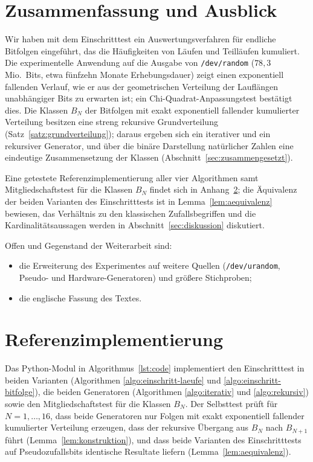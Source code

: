 \documentclass[11pt,a4paper]{scrartcl}
\theoremstyle{plain}
\theoremstyle{definition}
\theoremstyle{remark}
\begin{document}
\section{Zusammenfassung und Ausblick}\label{sec:schluss}

Wir haben mit dem Einschritttest ein Auswertungsverfahren für endliche
Bitfolgen eingeführt, das die Häufigkeiten von Läufen und Teilläufen
kumuliert. Die experimentelle Anwendung auf die Ausgabe von
\texttt{/dev/random} ($78,3$ Mio.\ Bits, etwa fünfzehn Monate
Erhebungsdauer) zeigt einen exponentiell fallenden Verlauf, wie er aus
der geometrischen Verteilung der Lauflängen unabhängiger Bits zu
erwarten ist; ein Chi-Quadrat-Anpassungstest bestätigt dies. Die
Klassen $B_N$ der Bitfolgen mit exakt exponentiell fallender
kumulierter Verteilung besitzen eine streng rekursive
Grundverteilung (Satz~\ref{satz:grundverteilung}); daraus ergeben sich
ein iterativer und ein rekursiver Generator, und über die binäre
Darstellung natürlicher Zahlen eine eindeutige Zusammensetzung der
Klassen (Abschnitt~\ref{sec:zusammengesetzt}).

Eine getestete Referenzimplementierung aller vier Algorithmen samt
Mitgliedschaftstest für die Klassen $B_N$ findet sich in
Anhang~\ref{sec:code}; die Äquivalenz der beiden Varianten des
Einschritttests ist in Lemma~\ref{lem:aequivalenz} bewiesen, das
Verhältnis zu den klassischen Zufallsbegriffen und die
Kardinalitätsaussagen werden in Abschnitt~\ref{sec:diskussion}
diskutiert.

Offen und Gegenstand der Weiterarbeit sind:
\begin{itemize}
  \item die Erweiterung des Experimentes auf weitere Quellen
        (\texttt{/dev/urandom}, Pseudo- und Hardware-Generatoren) und
        größere Stichproben;
  \item die englische Fassung des Textes.
\end{itemize}

\appendix
\section{Referenzimplementierung}\label{sec:code}

Das Python-Modul in Algorithmus~\ref{lst:code} implementiert den
Einschritttest in beiden Varianten (Algorithmen
\ref{algo:einschritt-laeufe} und \ref{algo:einschritt-bitfolge}), die
beiden Generatoren (Algorithmen \ref{algo:iterativ} und
\ref{algo:rekursiv}) sowie den Mitgliedschaftstest für die Klassen
$B_N$. Der Selbsttest prüft für $N=1,\dots,16$, dass beide Generatoren
nur Folgen mit exakt exponentiell fallender kumulierter Verteilung
erzeugen, dass der rekursive Übergang aus $B_N$ nach $B_{N+1}$ führt
(Lemma~\ref{lem:konstruktion}), und dass beide Varianten des
Einschritttests auf Pseudozufallsbits identische Resultate liefern
(Lemma~\ref{lem:aequivalenz}).



\printbibliography[title={Literaturverzeichnis}]
\end{document}
